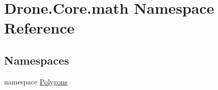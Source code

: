 \hypertarget{namespace_drone_1_1_core_1_1math}{}\section{Drone.\+Core.\+math Namespace Reference}
\label{namespace_drone_1_1_core_1_1math}
\subsection*{Namespaces}
\begin{DoxyCompactItemize}
\item 
namespace \hyperlink{namespace_drone_1_1_core_1_1math_1_1_polygons}{Polygons}
\end{DoxyCompactItemize}
